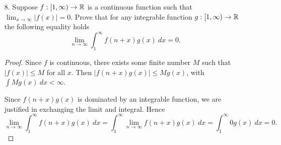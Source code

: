 \begin{itemize}
\begin{enumerate}[(a)]
\item Prove that $\int_{X} |f_n(x) - f(x)| \ d\mu(x) \leq \frac{1}{n}$ for all $n \in \bbn$ does not in general imply $f_n \rightarrow f$ pointwise a.e..
\begin{proof}
Consider the following modified typewriter sequence: $f_n = \frac{1}{2}\chi_{\{\frac{n-2^k}{2^k}, \frac{n+1-2^k}{2^k}\}}$ indexing over $2^k \leq n < 2^{k+1}$. This function converges to $0$ in $L^1$, but not pointwise a.e. to any function. 

See that $$\int_{X} f_n(x) \ d\mu = \int_{X} \frac{1}{2}\chi_{\{\frac{n-2^k}{2^k}, \frac{n+1-2^k}{2^k}\}} \ d\mu = \frac{1}{2} \left(\frac{n+1-2^k}{2^k} - \frac{n-2^k}{2^k} \right) = \frac{1}{2^{k+1}} < \frac{1}{n}.$$
This follows as $n < 2^{k+1}$ implies $\frac{1}{2^{k+1}} < \frac{1}{n}$.

\medskip 

But, this sequence jumps back up to satisfy $f_n(x)=1$ for infinitely many $x$, so cannot converge pointwise a.e. to the $0$ function. 
\end{proof}
\end{enumerate}





\item[8.] Suppose $f:[1,\infty) \rightarrow \mathbb{R}$ is a continuous function such that $\lim_{x \rightarrow \infty} |f(x)| = 0$. Prove that for any integrable function $g:[1,\infty) \rightarrow \mathbb{R}$ the following equality holds 
$$\lim_{n \rightarrow \infty} \int_{1}^{\infty} f(n+x)g(x) \ dx = 0.$$
\begin{proof}
Since $f$ is continuous, there exists some finite number $M$ such that $|f(x)| \leq M$ for all $x$. Then $|f(n+x)g(x)| \leq Mg(x)$, with $\int Mg(x) \ dx < \infty$.

\medskip 

Since $f(n+x)g(x)$ is dominated by an integrable function, we are justified in exchanging the limit and integral. Hence 
$$\lim_{n \rightarrow \infty} \int_{1}^{\infty} f(n+x)g(x) \ dx =  \int_{1}^{\infty} \lim_{n \rightarrow \infty} f(n+x)g(x) \ dx = \int_{1}^{\infty} 0 g(x) \ dx = 0.$$ 
\end{proof}





\end{itemize}
